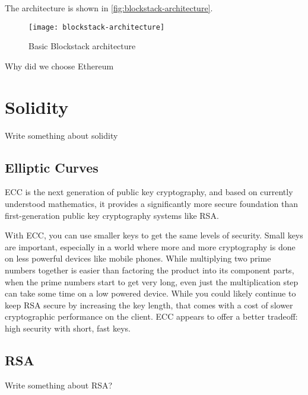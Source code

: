 The architecture is shown in \ref{fig:blockstack-architecture}.
\begin{figure}[h]
	\centering
  \texttt{[image: blockstack-architecture]}
	\caption{Basic Blockstack architecture}
	\label{fig1}
\end{figure}

\begin{notation}
	Why did we choose Ethereum
\end{notation}

\section{Solidity}
\begin{notation}
	Write something about solidity
\end{notation}

\subsection{Elliptic Curves}
ECC is the next generation of public key cryptography, and based on currently understood mathematics, it provides a significantly more secure foundation than first-generation public key cryptography systems like RSA.

With ECC, you can use smaller keys to get the same levels of security. Small keys are important, especially in a world where more and more cryptography is done on less powerful devices like mobile phones. While multiplying two prime numbers together is easier than factoring the product into its component parts, when the prime numbers start to get very long, even just the multiplication step can take some time on a low powered device. While you could likely continue to keep RSA secure by increasing the key length, that comes with a cost of slower cryptographic performance on the client. ECC appears to offer a better tradeoff: high security with short, fast keys.

\subsection{RSA}
\begin{notation}
	Write something about RSA?
\end{notation}

